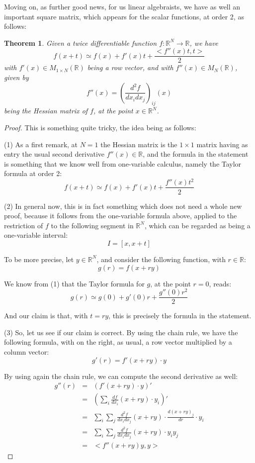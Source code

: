 \documentclass[12pt]{amsbook}
\newtheorem{theorem}{Theorem}[chapter]
\begin{document}
Moving on, as further good news, for us linear algebraists, we have as well an important square matrix, which appears for the scalar functions, at order 2, as follows:


\begin{theorem}
Given a twice differentiable function $f:\mathbb R^N\to\mathbb R$, we have
$$f(x+t)\simeq f(x)+f'(x)t+\frac{<f''(x)t,t>}{2}$$
with $f'(x)\in M_{1\times N}(\mathbb R)$ being a row vector, and with $f''(x)\in M_N(\mathbb R)$, given by 
$$f''(x)=\left(\frac{d^2f}{dx_idx_j}\right)_{ij}(x)$$
being the Hessian matrix of $f$, at the point $x\in\mathbb R^N$.
\end{theorem}

\begin{proof}
This is something quite tricky, the idea being as follows:

\medskip

(1) As a first remark, at $N=1$ the Hessian matrix is the $1\times1$ matrix having as entry the usual second derivative $f''(x)\in\mathbb R$, and the formula in the statement is something that we know well from one-variable calculus, namely the Taylor formula at order 2:
$$f(x+t)\simeq f(x)+f'(x)t+\frac{f''(x)t^2}{2}$$

(2) In general now, this is in fact something which does not need a whole new proof, because it follows from the one-variable formula above, applied to the restriction of $f$ to the following segment in $\mathbb R^N$, which can be regarded as being a one-variable interval:
$$I=[x,x+t]$$

To be more precise, let $y\in\mathbb R^N$, and consider the following function, with $r\in\mathbb R$:
$$g(r)=f(x+ry)$$

We know from (1) that the Taylor formula for $g$, at the point $r=0$, reads:
$$g(r)\simeq g(0)+g'(0)r+\frac{g''(0)r^2}{2}$$

And our claim is that, with $t=ry$, this is precisely the formula in the statement.

\medskip

(3) So, let us see if our claim is correct. By using the chain rule, we have the following formula, with on the right, as usual, a row vector multiplied by a column vector:
$$g'(r)=f'(x+ry)\cdot y$$

By using again the chain rule, we can compute the second derivative as well:
\begin{eqnarray*}
g''(r)
&=&(f'(x+ry)\cdot y)'\\
&=&\left(\sum_i\frac{df}{dx_i}(x+ry)\cdot y_i\right)'\\
&=&\sum_i\sum_j\frac{d^2f}{dx_idx_j}(x+ry)\cdot\frac{d(x+ry)_j}{dr}\cdot y_i\\
&=&\sum_i\sum_j\frac{d^2f}{dx_idx_j}(x+ry)\cdot y_iy_j\\
&=&<f''(x+ry)y,y>
\end{eqnarray*}


\end{proof}
\end{document}
